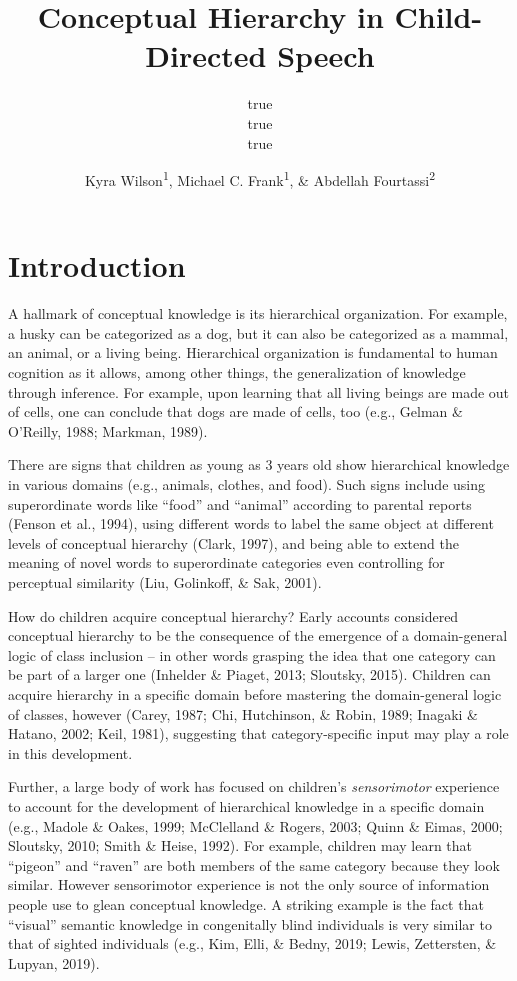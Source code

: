\documentclass[english,,man,floatsintext]{apa6}
\title{Conceptual Hierarchy in Child-Directed Speech}
\author{true \\ true \\ true}
\date{}
\author{Kyra Wilson\textsuperscript{1}, Michael C. Frank\textsuperscript{1}, \& Abdellah Fourtassi\textsuperscript{2}}
\affiliation{
\vspace{0.5cm}
\textsuperscript{1} Department of Psychology, Stanford University\\\textsuperscript{2} Department of Computer Science, Aix-Marseille University}
\begin{document}
\maketitle

\hypertarget{introduction}{%
\section{Introduction}\label{introduction}}

A hallmark of conceptual knowledge is its hierarchical organization. For example, a husky can be categorized as a dog, but it can also be categorized as a mammal, an animal, or a living being. Hierarchical organization is fundamental to human cognition as it allows, among other things, the generalization of knowledge through inference. For example, upon learning that all living beings are made out of cells, one can conclude that dogs are made of cells, too (e.g., Gelman \& O'Reilly, 1988; Markman, 1989).

There are signs that children as young as 3 years old show hierarchical knowledge in various domains (e.g., animals, clothes, and food). Such signs include using superordinate words like \enquote{food} and \enquote{animal} according to parental reports (Fenson et al., 1994), using different words to label the same object at different levels of conceptual hierarchy (Clark, 1997), and being able to extend the meaning of novel words to superordinate categories even controlling for perceptual similarity (Liu, Golinkoff, \& Sak, 2001).

How do children acquire conceptual hierarchy? Early accounts considered
conceptual hierarchy to be the consequence of the emergence of a
domain-general logic of class inclusion -- in other words grasping the idea that one category can be part of a larger one (Inhelder \& Piaget, 2013; Sloutsky, 2015). Children can acquire hierarchy in a specific domain before mastering the domain-general logic of classes, however (Carey, 1987; Chi, Hutchinson, \& Robin, 1989; Inagaki \& Hatano, 2002; Keil, 1981), suggesting that category-specific input may play a role in this development.

Further, a large body of work has focused on children's \emph{sensorimotor} experience to account for the development of hierarchical knowledge in a specific domain (e.g., Madole \& Oakes, 1999; McClelland \& Rogers, 2003; Quinn \& Eimas, 2000; Sloutsky, 2010; Smith \& Heise, 1992). For example, children may learn that \enquote{pigeon} and \enquote{raven} are both members of the same category because they look similar. However sensorimotor experience is not the only source of information people use to glean conceptual knowledge. A striking example is the fact that \enquote{visual} semantic knowledge in congenitally blind individuals is very similar to that of sighted individuals (e.g., Kim, Elli, \& Bedny, 2019; Lewis, Zettersten, \& Lupyan, 2019).
\end{document}
